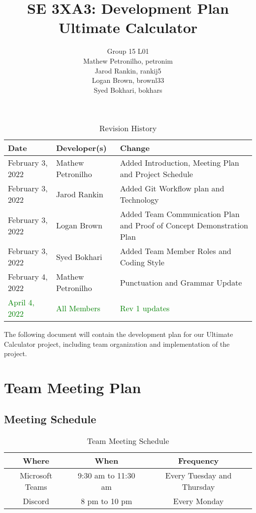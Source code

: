 \documentclass{article}
\title{SE 3XA3: Development Plan\\Ultimate Calculator}
\author{Group 15 L01
		\\ Mathew Petronilho, petronim
		\\ Jarod Rankin, rankij5
		\\ Logan Brown, brownl33
		\\ Syed Bokhari, bokhars
}
\date{}
\begin{document}
\begin{table}[hp]
\caption{Revision History} \label{TblRevisionHistory}
\begin{tabularx}{\textwidth}{llX}
\toprule
\textbf{Date} & \textbf{Developer(s)} & \textbf{Change}\\
\midrule
February 3, 2022 & Mathew Petronilho & Added Introduction, Meeting Plan and Project Schedule\\
February 3, 2022 & Jarod Rankin & Added Git Workflow plan and Technology\\
February 3, 2022 & Logan Brown & Added Team Communication Plan and Proof of Concept Demonstration Plan\\
February 3, 2022 & Syed Bokhari & Added Team Member Roles and Coding Style\\
February 4, 2022 & Mathew Petronilho & Punctuation and Grammar Update \\
\textcolor{Green}{April 4, 2022} & \textcolor{Green}{All Members} & \textcolor{Green}{Rev 1 updates}\\
\bottomrule
\end{tabularx}
\end{table}

\newpage

\maketitle

The following document will contain the development plan for our Ultimate Calculator project, including team organization and implementation of the project.

\section{Team Meeting Plan}
\subsection{Meeting Schedule}
\begin{table}[hbt!]
\begin{tabular}{|c|c|c|}
\hline
Where           & When                & Frequency                  \\ \hline
Microsoft Teams & 9:30 am to 11:30 am & Every Tuesday and Thursday \\
Discord         & 8 pm to 10 pm       & Every Monday               \\ \hline
\end{tabular}
\caption{Team Meeting Schedule}
\label{tab:my-table}
\end{table}
\end{document}
